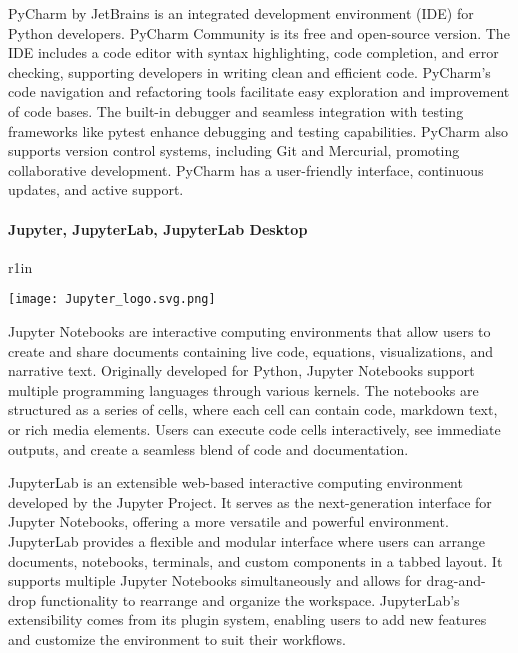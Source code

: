 PyCharm by JetBrains is an integrated development environment (IDE) for Python developers. PyCharm Community is its free and open-source version. The IDE includes a code editor with syntax highlighting, code completion, and error checking, supporting developers in writing clean and efficient code. PyCharm's code navigation and refactoring tools facilitate easy exploration and improvement of code bases. The built-in debugger and seamless integration with testing frameworks like pytest enhance debugging and testing capabilities. PyCharm also supports version control systems, including Git and Mercurial, promoting collaborative development. PyCharm has a user-friendly interface, continuous updates, and active support.

\paragraph*{Jupyter, JupyterLab, JupyterLab Desktop} 

\begin{wrapfigure}{r}{1in}
\begin{center}
\texttt{[image: Jupyter\_logo.svg.png]}
\end{center}
\end{wrapfigure}

Jupyter Notebooks are interactive computing environments that allow users to create and share documents containing live code, equations, visualizations, and narrative text. Originally developed for Python, Jupyter Notebooks support multiple programming languages through various kernels. The notebooks are structured as a series of cells, where each cell can contain code, markdown text, or rich media elements. Users can execute code cells interactively, see immediate outputs, and create a seamless blend of code and documentation.

JupyterLab is an extensible web-based interactive computing environment developed by the Jupyter Project. It serves as the next-generation interface for Jupyter Notebooks, offering a more versatile and powerful environment. JupyterLab provides a flexible and modular interface where users can arrange documents, notebooks, terminals, and custom components in a tabbed layout. It supports multiple Jupyter Notebooks simultaneously and allows for drag-and-drop functionality to rearrange and organize the workspace. JupyterLab's extensibility comes from its plugin system, enabling users to add new features and customize the environment to suit their workflows.

